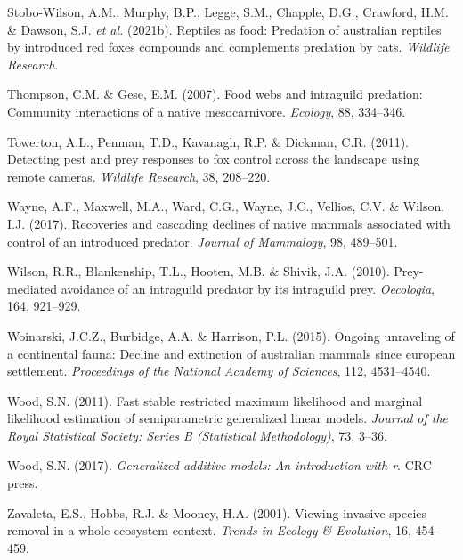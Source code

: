 \documentclass[]{elsarticle} %
\begin{document}
\leavevmode\hypertarget{ref-stobo2021reptiles}{}%
Stobo-Wilson, A.M., Murphy, B.P., Legge, S.M., Chapple, D.G., Crawford, H.M. \& Dawson, S.J. \emph{et al.} (2021b). Reptiles as food: Predation of australian reptiles by introduced red foxes compounds and complements predation by cats. \emph{Wildlife Research}.

\leavevmode\hypertarget{ref-thompson2007food}{}%
Thompson, C.M. \& Gese, E.M. (2007). Food webs and intraguild predation: Community interactions of a native mesocarnivore. \emph{Ecology}, 88, 334--346.

\leavevmode\hypertarget{ref-towerton2011}{}%
Towerton, A.L., Penman, T.D., Kavanagh, R.P. \& Dickman, C.R. (2011). Detecting pest and prey responses to fox control across the landscape using remote cameras. \emph{Wildlife Research}, 38, 208--220.

\leavevmode\hypertarget{ref-wayne2017recoveries}{}%
Wayne, A.F., Maxwell, M.A., Ward, C.G., Wayne, J.C., Vellios, C.V. \& Wilson, I.J. (2017). Recoveries and cascading declines of native mammals associated with control of an introduced predator. \emph{Journal of Mammalogy}, 98, 489--501.

\leavevmode\hypertarget{ref-wilson2010prey}{}%
Wilson, R.R., Blankenship, T.L., Hooten, M.B. \& Shivik, J.A. (2010). Prey-mediated avoidance of an intraguild predator by its intraguild prey. \emph{Oecologia}, 164, 921--929.

\leavevmode\hypertarget{ref-Woinarski4531}{}%
Woinarski, J.C.Z., Burbidge, A.A. \& Harrison, P.L. (2015). Ongoing unraveling of a continental fauna: Decline and extinction of australian mammals since european settlement. \emph{Proceedings of the National Academy of Sciences}, 112, 4531--4540.

\leavevmode\hypertarget{ref-wood2011}{}%
Wood, S.N. (2011). Fast stable restricted maximum likelihood and marginal likelihood estimation of semiparametric generalized linear models. \emph{Journal of the Royal Statistical Society: Series B (Statistical Methodology)}, 73, 3--36.

\leavevmode\hypertarget{ref-wood2017}{}%
Wood, S.N. (2017). \emph{Generalized additive models: An introduction with r}. CRC press.

\leavevmode\hypertarget{ref-zavaleta2001}{}%
Zavaleta, E.S., Hobbs, R.J. \& Mooney, H.A. (2001). Viewing invasive species removal in a whole-ecosystem context. \emph{Trends in Ecology \& Evolution}, 16, 454--459.
\end{document}

